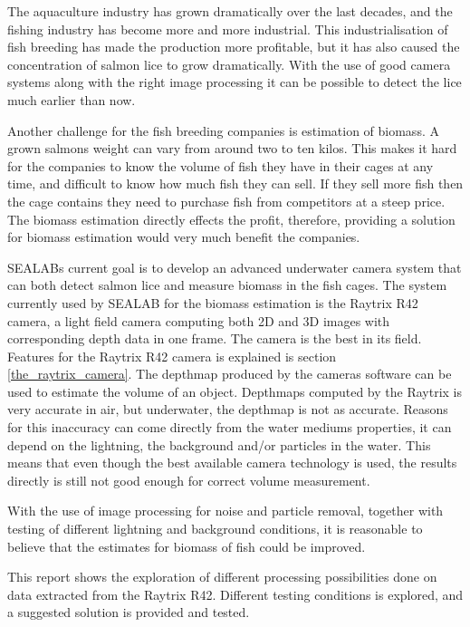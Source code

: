The aquaculture industry has grown dramatically over the last decades, and the fishing industry has become more and more industrial. This industrialisation of fish breeding has made the production more profitable, but it has also caused the concentration of salmon lice to grow dramatically. With the use of good camera systems along with the right image processing it can be possible to detect the lice much earlier than now. 

Another challenge for the fish breeding companies is estimation of biomass. A grown salmons weight can vary from around two to ten kilos. This makes it hard for the companies to know the volume of fish they have in their cages at any time, and difficult to know how much fish they can sell. If they sell more fish then the cage contains they need to purchase fish from competitors at a steep price. The biomass estimation directly effects the profit, therefore, providing a solution for biomass estimation would very much benefit the companies. 

SEALABs current goal is to develop an advanced underwater camera system that can both detect salmon lice and measure biomass in the fish cages.
The system currently used by SEALAB for the biomass estimation is the Raytrix R42 camera, a light field camera computing both 2D and 3D images with corresponding depth data in one frame. The camera is the best in its field. Features for the Raytrix R42 camera is explained is section \ref{the_raytrix_camera}. 
The depthmap produced by the cameras software can be used to estimate the volume of an object. Depthmaps computed by the Raytrix is very accurate in air, but underwater, the depthmap is not as accurate. Reasons for this inaccuracy can come directly from the water mediums properties, it can depend on the lightning, the background and/or particles in the water. This means that even though the best available camera technology is used, the results directly is still not good enough for correct volume measurement.

With the use of image processing for noise and particle removal, together with testing of different lightning and background conditions, it is reasonable to believe that the estimates for biomass of fish could be improved.

This report shows the exploration of different processing possibilities done on data extracted from the Raytrix R42. Different testing conditions is explored, and a suggested solution is provided and tested.




